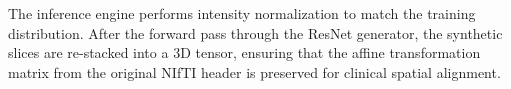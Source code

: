\documentclass[10pt,a4paper]{article}
\begin{document}
The inference engine performs intensity normalization to match the training distribution. After the forward pass through the ResNet generator, the synthetic slices are re-stacked into a 3D tensor, ensuring that the affine transformation matrix from the original NIfTI header is preserved for clinical spatial alignment.
\end{document}
